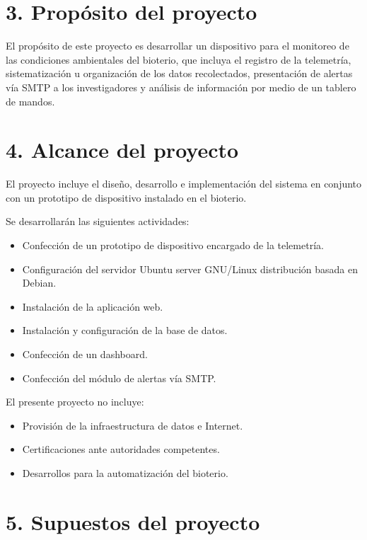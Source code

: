 \documentclass[
11pt, %
]{charter}
\begin{document}
\section{3. Propósito del proyecto}
\label{sec:proposito}
El propósito de este proyecto es desarrollar un dispositivo para el monitoreo de las condiciones ambientales del bioterio, que incluya el registro de la telemetría, sistematización u organización de los datos recolectados, presentación de alertas vía SMTP a los investigadores y análisis de información por medio de un tablero de mandos.

\section{4. Alcance del proyecto}
\label{sec:alcance}

El proyecto incluye el diseño, desarrollo e implementación del sistema en conjunto con un prototipo de dispositivo instalado en el bioterio.

Se desarrollarán las siguientes actividades:
\begin{itemize}
	\item Confección de un prototipo de dispositivo encargado de la telemetría.
	\item Configuración del servidor Ubuntu server GNU/Linux distribución basada en Debian.
	\item Instalación de la aplicación web.
	\item Instalación y configuración de la base de datos.
	\item Confección de un dashboard.
	\item Confección del módulo de alertas vía SMTP.
\end{itemize}


El presente proyecto no incluye:
\begin{itemize}
	\item Provisión de la infraestructura de datos e Internet.
	\item Certificaciones ante autoridades competentes.
	\item Desarrollos para la automatización del bioterio.
\end{itemize}

\section{5. Supuestos del proyecto}
\label{sec:supuestos}
\end{document}
